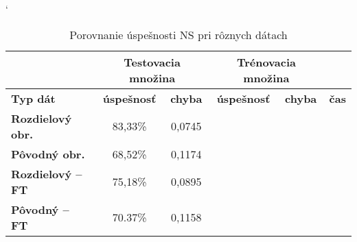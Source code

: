 




\begin{table}[h]
\catcode` %
\centering
\begin{tabular}{|l|c|c|c|c|c|}
\cline{2-5}
\multicolumn{1}{l}{} & \multicolumn{2}{|c|}{\textbf{Testovacia množina}} & \multicolumn{2}{c|}{\textbf{Trénovacia množina}} & \multicolumn{1}{l}{}\\ 
\hline
\textbf{Typ dát} & \textbf{úspešnosť} & \textbf{chyba} & \textbf{úspešnosť} & \textbf{chyba} & \textbf{čas} \\ \hline
\textbf{Rozdielový obr.} & 83,33\% & 0,0745 & & & \\ \hline
\textbf{Pôvodný obr.} & 68,52\% & 0,1174& & &\\ \hline
\textbf{Rozdielový -- FT} & 75,18\%& 0,0895& & &\\ \hline
\textbf{Pôvodný -- FT} & 70.37\%& 0,1158& & &\\
\hline
\end{tabular}
\caption{Porovnanie úspešnosti NS pri rôznych dátach}
\label{tab:neuraldatacmp}
\end{table}

\todo